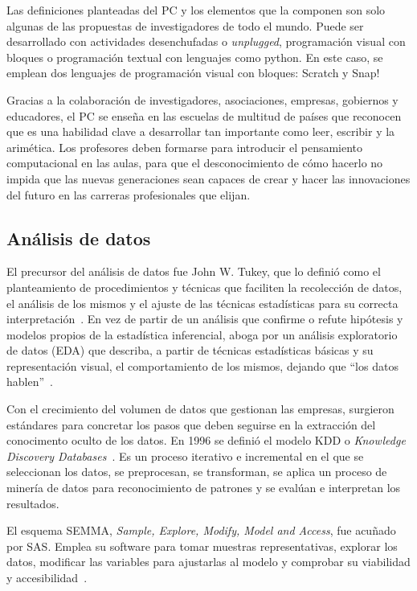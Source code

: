 \documentclass[a4paper, 12pt]{book}
\begin{document}
Las definiciones planteadas del PC y los elementos que la componen son solo algunas de las propuestas de investigadores de todo el mundo. Puede ser desarrollado con actividades desenchufadas o \emph{unplugged}, programación visual con bloques o programación textual con lenguajes como python. En este caso, se emplean dos lenguajes de programación visual con bloques: Scratch y Snap!

Gracias a la colaboración de investigadores, asociaciones, empresas, gobiernos y educadores, el PC se enseña en las escuelas de multitud de países que reconocen que es una habilidad clave a desarrollar tan importante como leer, escribir y la arimética. Los profesores deben formarse para introducir el pensamiento computacional en las aulas, para que el desconocimiento de cómo hacerlo no  impida que las nuevas generaciones sean capaces de crear y hacer las innovaciones del futuro en las carreras profesionales que elijan.

\subsection{Análisis de datos}
\label{subsec:analisis_datos}

El precursor del análisis de datos fue John W. Tukey, que lo definió como el planteamiento de procedimientos y técnicas que faciliten la recolección de datos, el análisis de los mismos y el ajuste de las técnicas estadísticas para su correcta interpretación~\cite{tukey1962future}. En vez de partir de un análisis que confirme o refute hipótesis y modelos propios de la estadística inferencial, aboga por un análisis exploratorio de datos (EDA) que describa, a partir de técnicas estadísticas básicas y su representación visual, el comportamiento de los mismos, dejando que ``los datos hablen''~\cite{tukey1977Eda}.

Con el crecimiento del volumen de datos que gestionan las empresas, surgieron estándares para concretar los pasos que deben seguirse en la extracción del conocimento oculto de los datos. En 1996 se definió el modelo KDD o \emph{Knowledge Discovery Databases}~\cite{fayyad1996kdd}. Es un proceso iterativo e incremental en el que se seleccionan los datos, se preprocesan, se transforman, se aplica un proceso de minería de datos para reconocimiento de patrones y se evalúan e interpretan los resultados.

El esquema SEMMA, \emph{Sample, Explore, Modify, Model and Access}, fue acuñado por SAS. Emplea su software para tomar muestras representativas, explorar los datos, modificar las variables para ajustarlas al modelo y comprobar su viabilidad y accesibilidad~\cite{azevedo2008kdd}. 
\end{document}
